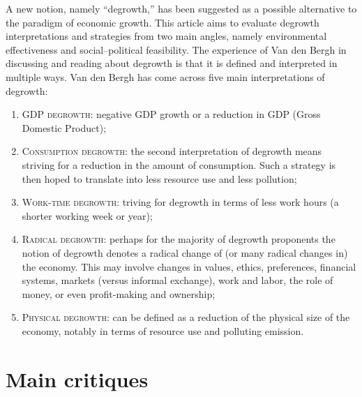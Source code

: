 A new notion, namely “degrowth,” has been suggested as a possible
alternative to the paradigm of economic growth. This article aims to evaluate degrowth interpretations and strategies from two main angles, namely environmental effectiveness and social–political feasibility. The experience of Van den Bergh in discussing and
reading about degrowth is that it is defined and interpreted in multiple ways. Van den Bergh has come across five main interpretations of
degrowth:
\begin{enumerate}
\item \textsc{GDP degrowth}: negative GDP growth or a reduction in GDP (Gross Domestic Product);
\item \textsc{Consumption degrowth}: the second interpretation of degrowth means striving for a reduction in the amount of consumption. Such a strategy is then hoped to translate into less resource use and less pollution; 
\item \textsc{Work-time degrowth}: triving for degrowth in
terms of less work hours (a shorter working week or year);
\item \textsc{Radical degrowth}: perhaps for the majority of degrowth proponents the notion of degrowth denotes a radical change of (or many radical changes in) the economy. This may involve changes in values, ethics, preferences, financial systems, markets (versus informal exchange), work and labor, the role of money, or even profit-making and ownership; 
\item \textsc{Physical degrowth}: can be defined as a reduction of the physical size of the economy, notably in terms of resource use and polluting emission.
\end{enumerate}

\section*{Main critiques}

